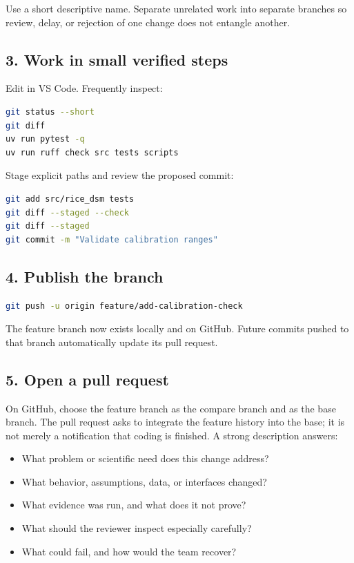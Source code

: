 Use a short descriptive name. Separate unrelated work into separate branches so
review, delay, or rejection of one change does not entangle another.

\subsection*{3. Work in small verified steps}

Edit in VS Code. Frequently inspect:

\begin{lstlisting}[language=bash,numbers=none]
git status --short
git diff
uv run pytest -q
uv run ruff check src tests scripts
\end{lstlisting}

Stage explicit paths and review the proposed commit:

\begin{lstlisting}[language=bash,numbers=none]
git add src/rice_dsm tests
git diff --staged --check
git diff --staged
git commit -m "Validate calibration ranges"
\end{lstlisting}

\subsection*{4. Publish the branch}

\begin{lstlisting}[language=bash,numbers=none]
git push -u origin feature/add-calibration-check
\end{lstlisting}

The feature branch now exists locally and on GitHub. Future commits pushed to
that branch automatically update its pull request.

\subsection*{5. Open a pull request}

On GitHub, choose the feature branch as the compare branch and  as the
base branch. The pull request asks to integrate the feature history into the
base; it is not merely a notification that coding is finished. A strong
description answers:

\begin{itemize}
  \item What problem or scientific need does this change address?
  \item What behavior, assumptions, data, or interfaces changed?
  \item What evidence was run, and what does it not prove?
  \item What should the reviewer inspect especially carefully?
  \item What could fail, and how would the team recover?
\end{itemize}

